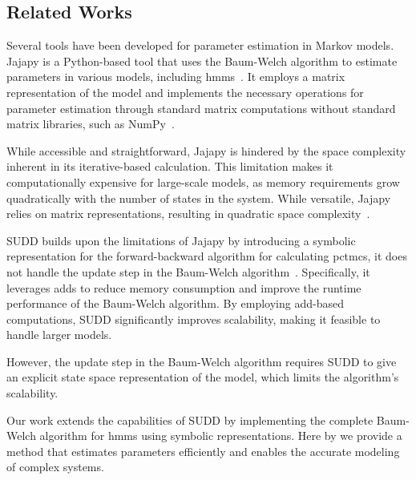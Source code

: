\subsection{Related Works}\label{subsec:related-works}
Several tools have been developed for parameter estimation in Markov models. 
Jajapy is a Python-based tool that uses the Baum-Welch algorithm to estimate parameters in various models, including \glspl{hmm}~\cite{reynouard2023jajapy}. 
It employs a matrix representation of the model and implements the necessary operations for parameter estimation through standard matrix computations without standard matrix libraries, such as NumPy~\cite{harris2020array}.

While accessible and straightforward, Jajapy is hindered by the space complexity inherent in its iterative-based calculation.
This limitation makes it computationally expensive for large-scale models, as memory requirements grow quadratically with the number of states in the system.
While versatile, Jajapy relies on matrix representations, resulting in quadratic space complexity~\cite{davis2004comparing}.

SUDD builds upon the limitations of Jajapy by introducing a symbolic representation for the forward-backward algorithm for calculating \glspl{pctmc}, it does not handle the update step in the Baum-Welch algorithm~\cite{p7}.
Specifically, it leverages \glspl{add} to reduce memory consumption and improve the runtime performance of the Baum-Welch algorithm.
By employing \gls{add}-based computations, SUDD significantly improves scalability, making it feasible to handle larger models.

However, the update step in the Baum-Welch algorithm requires SUDD to give an explicit state space representation of the model, which limits the algorithm's scalability.

Our work extends the capabilities of SUDD by implementing the complete Baum-Welch algorithm for \glspl{hmm} using symbolic representations.
Here by we provide a method that estimates parameters efficiently and enables the accurate modeling of complex systems.



